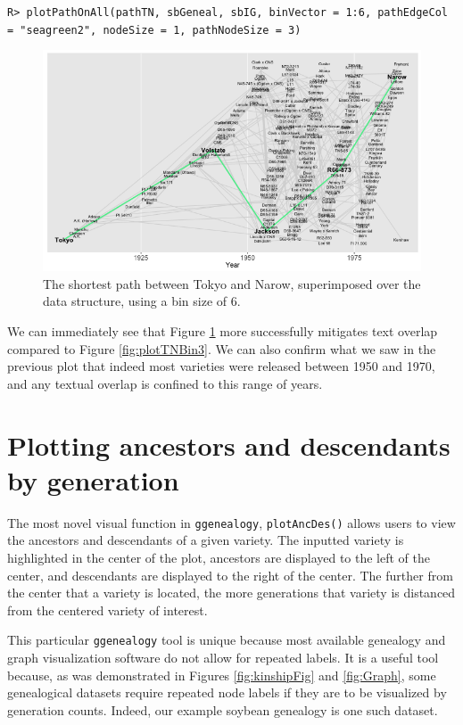 \documentclass[11pt,a4paper,oldfontcommands,openany]{memoir}
\DeclareRobustCommand{\mybox}[2][gray!15]{%
\begin{tcolorbox}[   %
        breakable,
        left=0pt,
        right=0pt,
        top=0pt,
        bottom=0pt,
        colback=#1,
        colframe=#1,
        width=\dimexpr\textwidth\relax, 
        enlarge left by=0mm,
        boxsep=5pt,
        arc=0pt,outer arc=0pt,
        ]
        #2
\end{tcolorbox}
}
\numberwithin{equation}{section} %
\newcommand{\code}[1]{{\texttt{#1}}}
\newcommand{\pkg}[1]{{\texttt{#1}}}
\begin{document}
\mybox{
\texttt{R> plotPathOnAll(pathTN, sbGeneal, sbIG, binVector = 1:6, pathEdgeCol = "seagreen2", nodeSize = 1, pathNodeSize = 3)}
}

\clearpage

\begin{figure}[H]
    \begin{framed}
    \centering
    \includegraphics[width=\textwidth]{plotTNBin6}
    \end{framed}
    \caption{The shortest path between Tokyo and Narow, superimposed over the data structure, using a bin size of 6.}
    \label{fig:plotTNBin6}
\end{figure}

We can immediately see that Figure \ref{fig:plotTNBin6} more successfully mitigates text overlap compared to Figure \ref{fig:plotTNBin3}. We can also confirm what we saw in the previous plot that indeed most varieties were released between 1950 and 1970, and any textual overlap is confined to this range of years.

\section{Plotting ancestors and descendants by generation}
\label{remedy}

The most novel visual function in \pkg{ggenealogy}, \code{plotAncDes()} allows users to view the ancestors and descendants of a given variety. The inputted variety is highlighted in the center of the plot, ancestors are displayed to the left of the center, and descendants are displayed to the right of the center. The further from the center that a variety is located, the more generations that variety is distanced from the centered variety of interest.

This particular \pkg{ggenealogy} tool is unique because most available genealogy and graph visualization software do not allow for repeated labels. It is a useful tool because, as was demonstrated in Figures \ref{fig:kinshipFig} and \ref{fig:Graph}, some genealogical datasets require repeated node labels if they are to be visualized by generation counts. Indeed, our example soybean genealogy is one such dataset.
\end{document}
